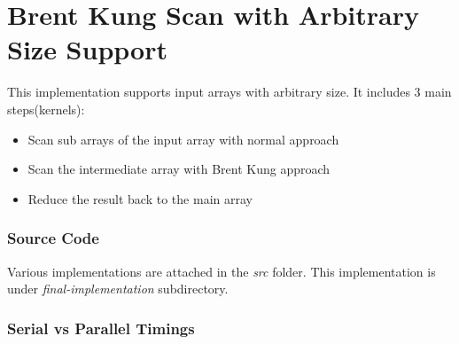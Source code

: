 \documentclass[12pt]{article}
\numberwithin{equation}{section}
\numberwithin{table}{section}
\numberwithin{figure}{section}
\begin{document}
\section{Brent Kung Scan with Arbitrary Size Support }
This implementation supports input arrays with arbitrary size. It includes 3 main steps(kernels):
\begin{itemize}
	\item Scan sub arrays of the input array with normal approach
	\item Scan the intermediate array with Brent Kung approach
	\item Reduce the result back to the main array
\end{itemize}

\subsubsection{Source Code}
Various implementations are attached in the \textit{src} folder. This implementation is under \textit{final-implementation} subdirectory.

\subsubsection{Serial vs Parallel Timings}
\end{document}
